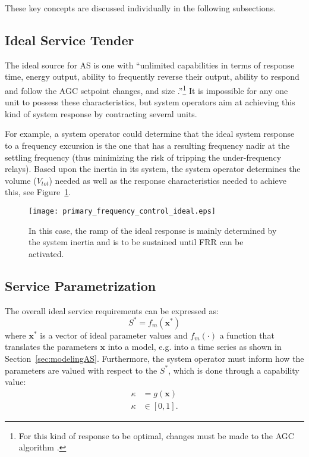 These key concepts are discussed individually in the following subsections.
\subsection{Ideal Service Tender} %
\label{sub:IdealServiceTender}
The ideal source for AS is one with ``unlimited capabilities in terms of response time, energy output, ability to frequently reverse their output, ability to respond and follow the AGC setpoint changes, and size .''\cite{makarov2008assessing}\footnote{For this kind of response to be optimal, changes must be made to the AGC algorithm \cite{peydayesh2012effects}.} It is impossible for any one unit to possess these characteristics, but system operators aim at achieving this kind of system response by contracting several units.

For example, a system operator could determine that the ideal system response to a frequency excursion is the one that has a resulting frequency nadir at the settling frequency (thus minimizing the risk of tripping the under-frequency relays). Based upon the inertia in its system, the system operator determines the volume ($V_{tot}$) needed as well as the response characteristics needed to achieve this, see Figure~\ref{fig:idealresponse}.

\begin{figure}[htbp!]
\centering
\texttt{[image: primary\_frequency\_control\_ideal.eps]}
\caption{In this case, the ramp of the ideal response is mainly determined by the system inertia and is to be sustained until FRR can be activated.}
\label{fig:idealresponse}
\end{figure}
\subsection{Service Parametrization} %
\label{sub:ServiceParametrization}
The overall ideal service requirements can be expressed as:
\begin{equation}
	S^* = f_m(\textbf{x}^*) \label{eq:optimaltender}
\end{equation}
where $\textbf{x}^*$ is a vector of ideal parameter values and $f_m(\cdot)$ a function that translates the parameters $\textbf{x}$ into a model, e.g. into a time series as shown in Section~\ref{sec:modelingAS}. Furthermore, the system operator must inform how the parameters are valued with respect to the $S^*$, which is done through a capability value:
\begin{align}
    \kappa &= g(\mathbf{x}) \\
    \kappa &\in [0,1].
\end{align}

